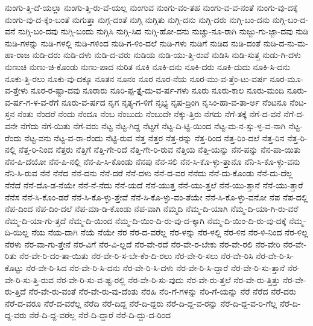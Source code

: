 {ನುಂಗು-ತ್ತಿ-ದೆ-ಯಲ್ಲಾ
ನುಂಗು-ತ್ತಿ-ರು-ವೆ-ಯಲ್ಲ
ನುಂಗುವ
ನುಂಗು-ವಂ-ತಹ
ನುಂಗು-ವ-ವ-ನಂತೆ
ನುಂಗು-ವು-ದಕ್ಕೆ
ನುಂಗು-ವು-ದ-ಕ್ಕೆಂ-ಬಂತೆ
ನುಗುತ್ತಾ
ನುಗ್ಗ-ದಂತೆ
ನುಗ್ಗಿ
ನುಗ್ಗಿತು
ನುಗ್ಗಿ-ದನು
ನುಗ್ಗಿ-ದರು
ನುಗ್ಗಿ-ಬಂ-ದನು
ನುಗ್ಗಿ-ಬಂ-ದ-ವನೆ
ನುಗ್ಗಿ-ಬಂ-ದವು
ನುಗ್ಗಿ-ಬಂದು
ನುಗ್ಗಿಸಿ
ನುಗ್ಗಿ-ಸಿದ
ನುಗ್ಗಿ-ಹೋ-ದನು
ನುಚ್ಚು-ನೂ-ರಾಗಿ
ನುಜ್ಜು-ಗು-ಜ್ಜಾ-ದವು
ನುಡಿ
ನುಡಿ-ಗಳನ್ನು
ನುಡಿ-ಗಳಲ್ಲಿ
ನುಡಿ-ಗಳಿಂದ
ನುಡಿ-ಗ-ಳಿಂ-ದಲೆ
ನುಡಿ-ಗಳು
ನುಡಿಗೆ
ನುಡಿದ
ನುಡಿ-ದಂತೆ
ನುಡಿ-ದ-ನು-ಮ-ಹಾ-ರಾಜ
ನುಡಿ-ದರು
ನುಡಿ-ದಳು
ನುಡಿ-ದ-ವರು
ನುಡಿಯ
ನುಡಿ-ಯು-ತ್ತಿ-ರುವೆ
ನುಡಿಸಿ
ನುಡಿ-ಸುತ್ತ
ನುಡು-ಗಿ-ದಳು
ನುಣುಚಿ
ನುಣು-ಚಿ-ಕೊಂಡು
ನುಣು-ಪಾದ
ನುರಿತ
ನೂಕಿ
ನೂಕಿ-ದನು
ನೂಕಿ-ದರು
ನೂಕಿ-ದುದು
ನೂಕಿ-ಸಿ-ದನು
ನೂಕು-ತ್ತಿ-ರಲು
ನೂಕು-ವು-ದಕ್ಕೂ
ನೂತನ
ನೂನಂ
ನೂರ
ನೂರ-ನೆಯ
ನೂರ-ಮು-ವ-ತ್ತೆಂ-ಟು-ವರ್ಷ
ನೂರ-ಮೂ-ವ-ತ್ತೇಳು
ನೂರ-ರ-ಷ್ಟಾ-ದವು
ನೂರಾರು
ನೂರಿ-ಪ್ಪ-ತ್ತೈ-ದು-ವ-ರ್ಷ-ಗಳು
ನೂರು
ನೂರು-ಕಾಲ
ನೂರು-ಮಂದಿ
ನೂರು-ವ-ರ್ಷ-ಗ-ಳ-ವ-ರೆಗೆ
ನೂರು-ವ-ರ್ಷದ
ನೃಗ
ನೃತ್ಯ-ಗ-ಳಿಗೆ
ನೃಭ್ಯ
ನೃಷ-ದ್ರಿಂಗಿ
ನೃಸಿಂ-ಹಾ-ವ-ತಾ-ರ್ಅ
ನೆಂಟನೂ
ನೆಂಟ-ಸ್ತನ
ನೆಂತು
ನೆಂದರೆ
ನೆಂದು
ನೆಂದೂ
ನೆಂಬ
ನೆಂಬುದು
ನೆಂಬುದೇ
ನೆಕ್ಕು-ತ್ತಿರು
ನೆಗದು
ನೆಗೆ-ತಕ್ಕೆ
ನೆಗೆ-ದ-ವನೆ
ನೆಗೆ-ದ-ವನೇ
ನೆಗೆದು
ನೆಗೆ-ಯಿತು
ನೆಗೆ-ವರು
ನೆಟ್ಟ
ನೆಟ್ಟ-ಗಿದ್ದ
ನೆಟ್ಟಗೆ
ನೆಟ್ಟ-ದಿ-ಟ್ಟಿ-ಯಿಂದ
ನೆಟ್ಟ-ಮ-ನ-ಸ್ಸು-ಳ್ಳ-ವ-ನಾಗಿ
ನೆಟ್ಟ-ರೆಂದು
ನೆಟ್ಟ-ವನು
ನೆಟ್ಟ-ವ-ರಾ-ರೆಂದು
ನೆಟ್ಟಿ-ರುವ
ನೆತ್ತ
ನೆತ್ತರ
ನೆತ್ತ-ರನ್ನು
ನೆತ್ತ-ರಿಂದ
ನೆತ್ತ-ರಿಂ-ದಲೆ
ನೆತ್ತ-ರಿನ
ನೆತ್ತ-ರಿ-ನಲ್ಲಿ
ನೆತ್ತ-ರಿ-ನಿಂದ
ನೆತ್ತರು
ನೆತ್ತಿಗೆ
ನೆತ್ತಿ-ಗೇ-ರಿದೆ
ನೆತ್ತಿ-ಗೇ-ರಿ-ರುವ
ನೆತ್ತಿಯ
ನೆತ್ತಿ-ಯನ್ನು
ನೆನ-ಪನ್ನು
ನೆನ-ಪಾ-ಯಿತು
ನೆನ-ಪಿ-ದೆಯೋ
ನೆನ-ಪಿ-ನಲ್ಲಿ
ನೆನ-ಪಿ-ಸಿ-ಕೊಂಡು
ನೆನಪು
ನೆನ-ಸಲಿ
ನೆನ-ಸಿ-ಕೊ-ಳ್ಳು-ತ್ತಾನೊ
ನೆನಿ-ಸಿ-ಕೊ-ಳ್ಳು-ವನು
ನೆನಿ-ಸಿ-ರುವ
ನೆನೆ
ನೆನೆದ
ನೆನೆ-ದನು
ನೆನೆ-ದರೆ
ನೆನೆ-ದಳು
ನೆನೆ-ದ-ವರ
ನೆನೆದು
ನೆನೆ-ದು-ಕೊಂಡು
ನೆನೆ-ದು-ದೆಲ್ಲ
ನೆನೆದೆ
ನೆನೆ-ದೊ-ಡ-ನೆಯೇ
ನೆನೆ-ನೆ-ನೆದು
ನೆನೆ-ಯದೆ
ನೆನೆ-ಯುತ್ತ
ನೆನೆ-ಯು-ತ್ತಲೆ
ನೆನೆ-ಯು-ತ್ತಾನೆ
ನೆನೆ-ಯು-ತ್ತಾರೆ
ನೆನೆಸ
ನೆನೆ-ಸಿ-ಕೊಂ-ಡರೆ
ನೆನೆ-ಸಿ-ಕೊ-ಳ್ಳು-ತ್ತೇವೆ
ನೆನೆ-ಸಿ-ಕೊ-ಳ್ಳು-ವಂ-ತೆಯೇ
ನೆನೆ-ಸಿ-ಕೊ-ಳ್ಳು-ವನೋ
ನೆಪ
ನೆಪ-ದಲ್ಲಿ
ನೆಪ-ದಿಂದ
ನೆಪ-ದಿಂ-ದಲೆ
ನೆಪ-ಮಾ-ಡಿ-ಕೊಂಡು
ನೆಪ-ವಾಗಿ
ನೆಮ್ಮದಿ
ನೆಮ್ಮ-ದಿ-ಯಾಗಿ
ನೆಮ್ಮ-ದಿ-ಯಾ-ಗಿ-ರು-ವರೆ
ನೆಮ್ಮ-ದಿ-ಯಾ-ಗು-ತ್ತದೆ
ನೆಮ್ಮ-ದಿ-ಯಿಂದ
ನೆಮ್ಮ-ದಿ-ಯಿಂ-ದಿ-ರು-ವು-ದ-ಕ್ಕಾಗಿ
ನೆಮ್ಮ-ದಿ-ಯಿಂ-ದಿ-ರು-ವು-ದಕ್ಕೆ
ನೆಮ್ಮ-ದಿ-ಯಿಲ್ಲ
ನೆಯ
ನೆಯ-ದಾಗಿ
ನೆಯೆ
ನೆಯೇ
ನೆರ
ನೆರ-ದ-ವರೆಲ್ಲ
ನೆರ-ಳನ್ನು
ನೆರ-ಳಲ್ಲಿ
ನೆರ-ಳಿನ
ನೆರ-ಳಿ-ನಿಂದ
ನೆರ-ಳಿಲ್ಲ
ನೆರಳು
ನೆರ-ವಾ-ಗು-ತ್ತೇನೆ
ನೆರ-ವಿಗೆ
ನೆರ-ವಿ-ಲ್ಲದೆ
ನೆರ-ವೇ-ರದೆ
ನೆರ-ವೇ-ರ-ಬೇಕು
ನೆರ-ವೇ-ರಲಿ
ನೆರ-ವೇರಿ
ನೆರ-ವೇ-ರಿತು
ನೆರ-ವೇ-ರಿ-ದಂ-ತಾ-ಯಿತು
ನೆರ-ವೇ-ರಿ-ಸ-ಬೇ-ಕೆಂ-ದಿ-ರಲು
ನೆರ-ವೇ-ರಿ-ಸಲು
ನೆರ-ವೇ-ರಿಸಿ
ನೆರ-ವೇ-ರಿ-ಸಿ-ಕೊಟ್ಟು
ನೆರ-ವೇ-ರಿ-ಸಿದ
ನೆರ-ವೇ-ರಿ-ಸಿ-ದನು
ನೆರ-ವೇ-ರಿ-ಸಿ-ದಳು
ನೆರ-ವೇ-ರಿ-ಸಿ-ದ್ದಾರೆ
ನೆರ-ವೇ-ರಿ-ಸು-ತ್ತಾನೆ
ನೆರ-ವೇ-ರಿ-ಸು-ತ್ತಿ-ರುವ
ನೆರ-ವೇ-ರಿ-ಸು-ವ-ಷ್ಟ-ರಲ್ಲಿ
ನೆರ-ವೇ-ರಿ-ಸು-ವುದು
ನೆರ-ವೇ-ರು-ತ್ತಲೆ
ನೆರ-ವೇ-ರು-ತ್ತಿತ್ತು
ನೆರ-ವೇ-ರು-ತ್ತಿದೆ
ನೆರ-ವೇ-ರು-ವಂತೆ
ನೆರ-ವೇ-ರು-ವು-ದೆಂತು
ನೆರಹಿ
ನೆರಿ-ಗೆ-ಗಳನ್ನು
ನೆರಿ-ಗೆ-ಯನ್ನು
ನೆರೆ
ನೆರೆದ
ನೆರೆ-ದರು
ನೆರೆ-ದ-ವರೂ
ನೆರೆ-ದ-ವರೆಲ್ಲ
ನೆರೆದಿ
ನೆರೆ-ದಿದ್ದ
ನೆರೆ-ದಿ-ದ್ದರು
ನೆರೆ-ದಿ-ದ್ದ-ವ-ರನ್ನು
ನೆರೆ-ದಿ-ದ್ದ-ವ-ರಿ-ಗೆಲ್ಲ
ನೆರೆ-ದಿ-ದ್ದ-ವರು
ನೆರೆ-ದಿ-ದ್ದ-ವರೆಲ್ಲ
ನೆರೆ-ದಿ-ದ್ದಾರೆ
ನೆರೆ-ದಿ-ದ್ದು-ದ-ರಿಂದ
}
